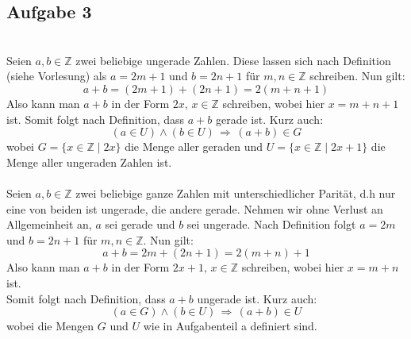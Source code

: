 \documentclass[a4paper,graphics,11pt]{article}
\newcommand\aufgabe[1]{\subsection*{Aufgabe #1}}
\begin{document}
\aufgabe{3}
    \begin{tasks}
        \task\\
            Seien $a,b \in \mathbb{Z}$ zwei beliebige ungerade Zahlen. Diese lassen sich
            nach Definition\\
            (siehe Vorlesung) als $a=2m+1$ und $b=2n+1$ für $m,n \in \mathbb{Z}$
            schreiben. Nun gilt:
            $$ a+b = (2m+1) + (2n+1) = 2(m+n+1) $$
            Also kann man $a+b$ in der Form $2x,\,x \in \mathbb{Z}$ schreiben, wobei hier
            $x = m+n+1$ ist. Somit folgt nach Definition, dass $a+b$ gerade ist.
            Kurz auch:
            $$ (a \in U) \land (b \in U) \,\Rightarrow\, (a+b) \in G $$
            wobei $G = \{x \in \mathbb{Z} \mid 2x\}$ die Menge aller geraden und
            $U = \{x \in \mathbb{Z} \mid 2x+1\}$ die Menge aller ungeraden Zahlen ist.
        \\

        \task\\
            Seien $a,b \in \mathbb{Z}$ zwei beliebige ganze Zahlen mit unterschiedlicher
            Parität, d.h nur eine von beiden ist ungerade, die andere gerade.
            Nehmen wir ohne Verlust an Allgemeinheit an, $a$ sei gerade und $b$ sei
            ungerade. Nach Definition folgt
            $a = 2m$ und $b = 2n+1$ für $m,n \in \mathbb{Z}$. Nun gilt:
            $$ a+b = 2m + (2n+1) = 2(m+n) +1 $$
            Also kann man $a+b$ in der Form $2x+1,\,x \in \mathbb{Z}$ schreiben, wobei
            hier $x=m+n$ ist.\\
            Somit folgt nach Definition, dass $a+b$ ungerade ist. Kurz auch:
            $$ (a \in G) \land (b \in U) \,\Rightarrow\, (a+b) \in U $$
            wobei die Mengen $G$ und $U$ wie in Aufgabenteil a definiert sind.
    \end{tasks}
\end{document}
